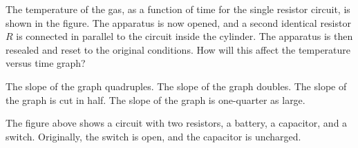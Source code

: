 \documentclass{../../oss-apphys-exam}
\begin{document}
\begin{questions}
  \question The temperature of the gas, as a function of time for the single
  resistor circuit, is shown in the figure. The apparatus is now opened, and a
  second identical resistor $R$ is connected in parallel to the circuit inside
  the cylinder. The apparatus is then resealed and reset to the original
  conditions. How will this affect the temperature versus time graph?
  \label{temp2}
  \begin{center}
  \end{center}
  \begin{choices}
    \choice The slope of the graph quadruples.
    \choice The slope of the graph doubles.
    \choice The slope of the graph is cut in half.
    \choice The slope of the graph is one-quarter as large.
  \end{choices}
  \newpage

  \classkickFRQinstructions
  
  \question The figure above shows a circuit with two resistors, a battery, a
  capacitor, and a switch. Originally, the switch is open, and the capacitor is
  uncharged.

\end{questions}
\end{document}
